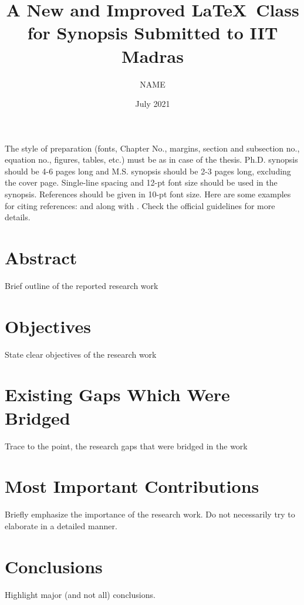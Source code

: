 \documentclass[PhD,synopsis,BlueTape]{iitmdiss}
\title{A New and Improved \LaTeX\ Class for Synopsis Submitted to IIT Madras}
\author{NAME}
\date{July 2021}
\begin{document}
\maketitle
\restoregeometry

\setcounter{page}{0}

\singlespacing

The style of preparation (fonts, Chapter No., margins, section and subsection no.,
equation no., figures, tables, etc.) must be as in case of the thesis. Ph.D. synopsis should be 4-6 pages long and M.S. synopsis should be 2-3 pages
long, excluding the cover page. Single-line spacing and 12-pt font size should be used in the synopsis. References should be given in 10-pt font size. Here are some examples for citing references: \cite{lamport:86} and \cite{Ahren2005} along with \cite{Roenby2016}. Check the official guidelines for more details.

\section{Abstract}
Brief outline of the reported research work

\section{Objectives}
State clear objectives of the research work

\section{Existing Gaps Which Were Bridged}
Trace to the point, the research gaps that were bridged in the work

\section{Most Important Contributions}
Briefly emphasize the importance of the research work. Do not necessarily try to elaborate in a detailed manner.

\section{Conclusions}
Highlight major (and not all) conclusions.
\end{document}
